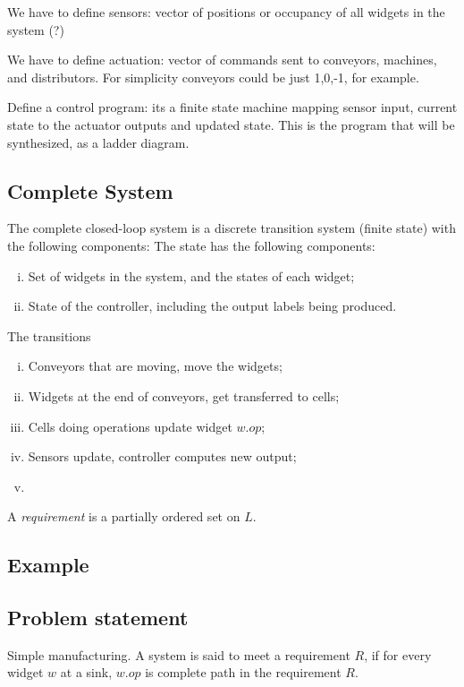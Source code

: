 \documentclass[9pt,conference, compsocconf]{IEEEtran}
\begin{document}
We have to define sensors: vector of positions or occupancy of all widgets in the system (?) 

We have to define actuation: vector of commands sent to conveyors, machines, and distributors.
For simplicity conveyors could be just 1,0,-1, for example.

Define a control program: its a finite state machine mapping sensor input, current state to the actuator outputs and updated state. 
This is the program that will be synthesized, as a ladder diagram.

\subsection{Complete System}
\label{sec:complte}
The complete  closed-loop system is a discrete transition system (finite state) with the following components:
The state has the following components:
\begin{enumerate}[(i)]
\item Set of widgets in the system, and the states of each widget;
\item State of the controller, including the output labels being produced.
\end{enumerate}
The transitions 
\begin{enumerate}[(i)]
	\item Conveyors that are moving, move the widgets;
	\item Widgets at the end of conveyors, get transferred to cells;
	\item Cells doing operations update widget $\mathit{w.op}$;
	\item Sensors update, controller computes new output;
	\item 
\end{enumerate}


A {\em requirement\/} is a partially ordered set on $L$.

\subsection{Example}


\subsection{Problem statement}
\label{sec:problem}
Simple manufacturing.
A system is said to meet a requirement $R$, if for every widget $w$ at a sink, $\mathit{w.op}$ is complete path in the requirement $R$. 
\end{document}
